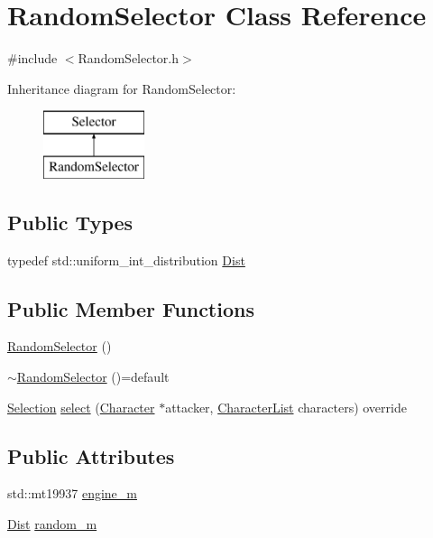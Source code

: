 \hypertarget{class_random_selector}{}\section{Random\+Selector Class Reference}
\label{class_random_selector}


{\ttfamily \#include $<$Random\+Selector.\+h$>$}

Inheritance diagram for Random\+Selector\+:\begin{figure}[H]
\begin{center}
\leavevmode
\includegraphics[height=2.000000cm]{class_random_selector}
\end{center}
\end{figure}
\subsection*{Public Types}
\begin{DoxyCompactItemize}
\item 
typedef std\+::uniform\+\_\+int\+\_\+distribution \hyperlink{class_random_selector_aa19efc61b8b330971db574f39e4f623b}{Dist}
\end{DoxyCompactItemize}
\subsection*{Public Member Functions}
\begin{DoxyCompactItemize}
\item 
\hyperlink{class_random_selector_a9711b846989394963835acfd4da8b7aa}{Random\+Selector} ()
\item 
\hyperlink{class_random_selector_a19c6e54d2055c7e317c128e1d8c72ffe}{$\sim$\+Random\+Selector} ()=default
\item 
\hyperlink{struct_selection}{Selection} \hyperlink{class_random_selector_a3d7e78cf6cd4c2ec497d4ad984e39492}{select} (\hyperlink{class_character}{Character} $\ast$attacker, \hyperlink{class_character_list}{Character\+List} characters) override
\end{DoxyCompactItemize}
\subsection*{Public Attributes}
\begin{DoxyCompactItemize}
\item 
std\+::mt19937 \hyperlink{class_random_selector_a141cf5ff4752ece62b71a880501601b3}{engine\+\_\+m}
\item 
\hyperlink{class_random_selector_aa19efc61b8b330971db574f39e4f623b}{Dist} \hyperlink{class_random_selector_adbb8b79d964616048efb5554da2eb561}{random\+\_\+m}
\end{DoxyCompactItemize}


